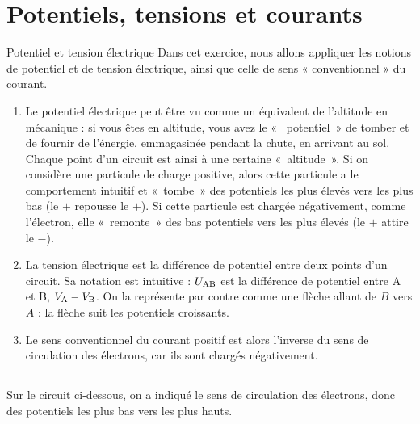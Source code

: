 \documentclass[10pt,a5paper,notitlepage]{book}
\begin{document}
\section{Potentiels, tensions et courants}

\begin{defi}{Potentiel et tension électrique}
	Dans cet exercice, nous allons appliquer les notions de potentiel et de
    tension électrique, ainsi que celle de sens « conventionnel » du courant.
	\begin{enumerate}
        \item Le potentiel électrique peut être vu comme un équivalent de
            l'altitude en mécanique : si vous êtes en altitude, vous avez le «~
            potentiel~» de tomber et de fournir de l'énergie, emmagasinée
            pendant la chute, en arrivant au sol. Chaque point d'un circuit est
            ainsi à une certaine «~altitude~». Si on considère une particule de
            charge positive, alors cette particule a le comportement intuitif et
            «~tombe~» des potentiels les plus élevés vers les plus bas (le $+$
            repousse le $+$). Si cette particule est chargée négativement, comme
            l'électron, elle «~remonte~» des bas potentiels vers les plus élevés
            (le $+$ attire le $-$).
        \item La tension électrique est la différence de potentiel entre deux
            points d'un circuit. Sa notation est intuitive : $U_{\rm AB}$ est la
            différence de potentiel entre A et B, $V_{\rm A} - V_{\rm B}$. On la
            représente par contre comme une flèche allant de $B$ vers $A$ : la
            flèche suit les potentiels croissants.
        \item Le sens conventionnel du courant positif est alors l'inverse du
            sens de circulation des électrons, car ils sont chargés
            négativement.
	\end{enumerate}
\end{defi}

\subsection{}
Sur le circuit ci-dessous, on a indiqué le sens de circulation des électrons,
donc des potentiels les plus bas vers les plus hauts.
\end{document}
